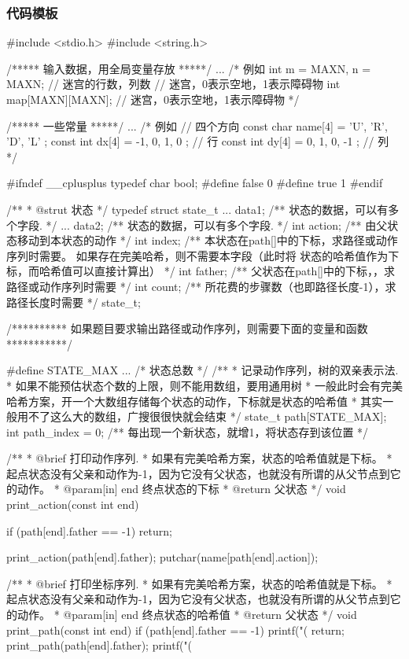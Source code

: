 \subsubsection{代码模板}
\begin{Codex}[label=bfs_template.c]
#include <stdio.h>
#include <string.h>

/***** 输入数据，用全局变量存放 *****/
...
/*
例如
int m = MAXN, n = MAXN;  // 迷宫的行数，列数
// 迷宫，0表示空地，1表示障碍物
int map[MAXN][MAXN];  // 迷宫，0表示空地，1表示障碍物
 */

/***** 一些常量 *****/
...
/* 例如
// 四个方向
const char name[4] = { 'U', 'R', 'D', 'L' };
const int dx[4] = { -1, 0, 1, 0 }; // 行
const int dy[4] = { 0, 1, 0, -1 }; // 列
*/

#ifndef __cplusplus
typedef char bool;
#define false 0
#define true 1
#endif

/**
 * @strut 状态
 */
typedef struct state_t {
    ... data1;  /** 状态的数据，可以有多个字段. */
    ... data2;  /** 状态的数据，可以有多个字段. */
    int action; /** 由父状态移动到本状态的动作 */
    int index;  /** 本状态在path[]中的下标，求路径或动作序列时需要。
                    如果存在完美哈希，则不需要本字段（此时将
                   状态的哈希值作为下标，而哈希值可以直接计算出） */
    int father; /** 父状态在path[]中的下标，，求路径或动作序列时需要 */
    int count;  /** 所花费的步骤数（也即路径长度-1），求路径长度时需要 */
} state_t;

/********** 如果题目要求输出路径或动作序列，则需要下面的变量和函数 ***********/

#define STATE_MAX ...  /* 状态总数 */
/**
 * 记录动作序列，树的双亲表示法.
 * 如果不能预估状态个数的上限，则不能用数组，要用通用树
 * 一般此时会有完美哈希方案，开一个大数组存储每个状态的动作，下标就是状态的哈希值
 * 其实一般用不了这么大的数组，广搜很很快就会结束
 */
state_t path[STATE_MAX];
int path_index = 0;  /** 每出现一个新状态，就增1，将状态存到该位置 */

/**
 * @brief 打印动作序列.
 * 如果有完美哈希方案，状态的哈希值就是下标。
 * 起点状态没有父亲和动作为-1，因为它没有父状态，也就没有所谓的从父节点到它的动作。
 * @param[in] end 终点状态的下标
 * @return 父状态
 */
void print_action(const int end) {
    if (path[end].father == -1) return;

    print_action(path[end].father);
    putchar(name[path[end].action]);
}

/**
 * @brief 打印坐标序列.
 * 如果有完美哈希方案，状态的哈希值就是下标。
 * 起点状态没有父亲和动作为-1，因为它没有父状态，也就没有所谓的从父节点到它的动作。
 * @param[in] end 终点状态的哈希值
 * @return 父状态
 */
void print_path(const int end) {
    if (path[end].father == -1) {
        printf("(%
        return;
    }
    print_path(path[end].father);
    printf("(%
}


\end{Codex}
